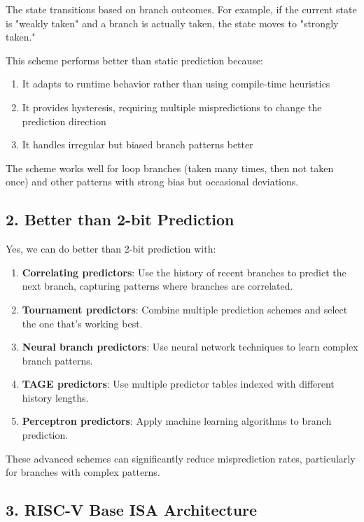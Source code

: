 \documentclass[12pt]{article}
\begin{document}
The state transitions based on branch outcomes. For example, if the current state is "weakly taken" and a branch is actually taken, the state moves to "strongly taken."

This scheme performs better than static prediction because:
\begin{enumerate}
    \item It adapts to runtime behavior rather than using compile-time heuristics
    \item It provides hysteresis, requiring multiple mispredictions to change the prediction direction
    \item It handles irregular but biased branch patterns better
\end{enumerate}

The scheme works well for loop branches (taken many times, then not taken once) and other patterns with strong bias but occasional deviations.

\subsection*{2. Better than 2-bit Prediction}

Yes, we can do better than 2-bit prediction with:

\begin{enumerate}
    \item \textbf{Correlating predictors}: Use the history of recent branches to predict the next branch, capturing patterns where branches are correlated.
    
    \item \textbf{Tournament predictors}: Combine multiple prediction schemes and select the one that's working best.
    
    \item \textbf{Neural branch predictors}: Use neural network techniques to learn complex branch patterns.
    
    \item \textbf{TAGE predictors}: Use multiple predictor tables indexed with different history lengths.
    
    \item \textbf{Perceptron predictors}: Apply machine learning algorithms to branch prediction.
\end{enumerate}

These advanced schemes can significantly reduce misprediction rates, particularly for branches with complex patterns.

\subsection*{3. RISC-V Base ISA Architecture}
\end{document}
